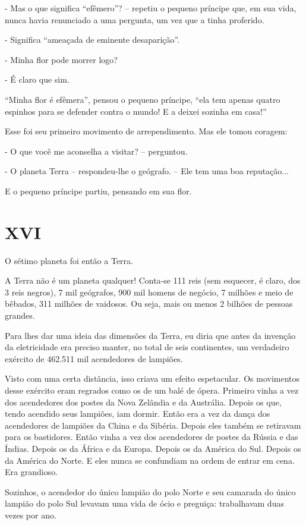 - Mas o que significa ``efêmero''? -- repetiu o pequeno príncipe que, em
sua vida, nunca havia renunciado a uma pergunta, um vez que a tinha
proferido.

- Significa ``ameaçada de eminente desaparição''.

- Minha flor pode morrer logo?

- É claro que sim.

``Minha flor é efêmera'', pensou o pequeno príncipe, ``ela tem apenas
quatro espinhos para se defender contra o mundo! E a deixei sozinha em
casa!''

Esse foi seu primeiro movimento de arrependimento. Mas ele tomou
coragem:

- O que você me aconselha a visitar? -- perguntou.

- O planeta Terra -- respondeu-lhe o geógrafo. -- Ele tem uma boa
reputação...

E o pequeno príncipe partiu, pensando em sua flor.

\chapter{XVI}

O sétimo planeta foi então a Terra.

A Terra não é um planeta qualquer! Conta-se 111 reis (sem esquecer, é
claro, dos 3 reis negros), 7 mil geógrafos, 900 mil homens de negócio, 7
milhões e meio de bêbados, 311 milhões de vaidosos. Ou seja, mais ou
menos 2 bilhões de pessoas grandes.

Para lhes dar uma ideia das dimensões da Terra, eu diria que antes da
invenção da eletricidade era preciso manter, no total de seis
continentes, um verdadeiro exército de 462.511 mil acendedores de
lampiões.

Visto com uma certa distância, isso criava um efeito espetacular. Os
movimentos desse exército eram regrados como os de um balé de ópera.
Primeiro vinha a vez dos acendedores dos postes da Nova Zelândia e da
Austrália. Depois os que, tendo acendido seus lampiões, iam dormir.
Então era a vez da dança dos acendedores de lampiões da China e da
Sibéria. Depois eles também se retiravam para os bastidores. Então vinha
a vez dos acendedores de postes da Rússia e das Índias. Depois os da
África e da Europa. Depois os da América do Sul. Depois os da América do
Norte. E eles nunca se confundiam na ordem de entrar em cena. Era
grandioso.

Sozinhos, o acendedor do único lampião do polo Norte e seu camarada do
único lampião do polo Sul levavam uma vida de ócio e preguiça:
trabalhavam duas vezes por ano.

